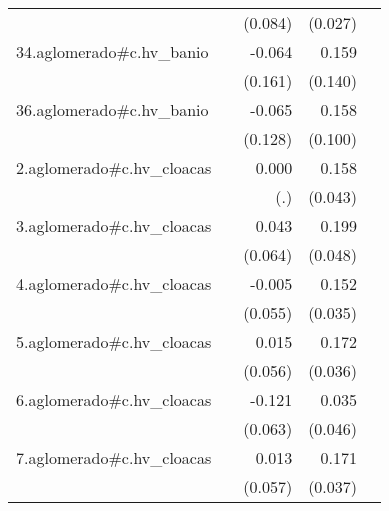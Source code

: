 {\begin{longtable}{l*{4}{D{.}{.}{-1}}}
            &                     &     (0.084)         &     (0.027)         &                     \\
\addlinespace
34.aglomerado#c.hv\_banio&                     &      -0.064         &       0.159         &                     \\
            &                     &     (0.161)         &     (0.140)         &                     \\
\addlinespace
36.aglomerado#c.hv\_banio&                     &      -0.065         &       0.158         &                     \\
            &                     &     (0.128)         &     (0.100)         &                     \\
\addlinespace
2.aglomerado#c.hv\_cloacas&                     &       0.000         &       0.158\sym{***}&                     \\
            &                     &         (.)         &     (0.043)         &                     \\
\addlinespace
3.aglomerado#c.hv\_cloacas&                     &       0.043         &       0.199\sym{***}&                     \\
            &                     &     (0.064)         &     (0.048)         &                     \\
\addlinespace
4.aglomerado#c.hv\_cloacas&                     &      -0.005         &       0.152\sym{***}&                     \\
            &                     &     (0.055)         &     (0.035)         &                     \\
\addlinespace
5.aglomerado#c.hv\_cloacas&                     &       0.015         &       0.172\sym{***}&                     \\
            &                     &     (0.056)         &     (0.036)         &                     \\
\addlinespace
6.aglomerado#c.hv\_cloacas&                     &      -0.121         &       0.035         &                     \\
            &                     &     (0.063)         &     (0.046)         &                     \\
\addlinespace
7.aglomerado#c.hv\_cloacas&                     &       0.013         &       0.171\sym{***}&                     \\
            &                     &     (0.057)         &     (0.037)         &                     \\

\end{longtable}}
